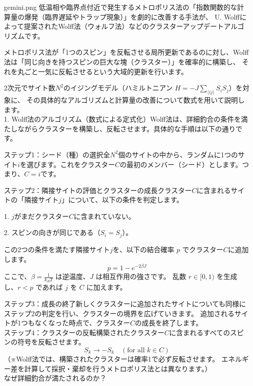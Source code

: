 \documentclass[a4paper,10.5pt]{jlreq}
\begin{document}
\begin{chatbox}{gemini.png}
  低温相や臨界点付近で発生するメトロポリス法の「指数関数的な計算量の爆発（臨界遅延やトラップ現象）」を劇的に改善する手法が、
  U. Wolffによって提案されたWolff法（ウォルフ法）などのクラスターアップデートアルゴリズムです。

  メトロポリス法が「1つのスピン」を反転させる局所更新であるのに対し、Wolff法は「同じ向きを持つスピンの巨大な塊（クラスター）」を確率的に構築し、
  それを丸ごと一気に反転させるという大域的更新を行います。
  
  2次元でサイト数$N^2$のイジングモデル（ハミルトニアン $H = -J\sum_{\langle ij \rangle} S_i S_j$）を対象に、
  その具体的なアルゴリズムと計算量の改善について数式を用いて説明します。\\
  
  1. Wolff法のアルゴリズム（数式による定式化）Wolff法は、詳細釣合の条件を満たしながらクラスターを構築し、反転させます。具体的な手順は以下の通りです。
  
  ステップ1：シード（種）の選択全$N^2$個のサイトの中から、ランダムに1つのサイト$i$を選びます。これをクラスター$C$の最初のメンバー（シード）とします。つまり、$C = {i}$です。
  
  ステップ2：隣接サイトの評価とクラスターの成長クラスター$C$に含まれるサイトの「隣接サイト$j$」について、以下の条件を判定します。

  1. $j$がまだクラスター$C$に含まれていない。

  2. スピンの向きが同じである（$S_i = S_j$）。
  
  この2つの条件を満たす隣接サイト$j$を、以下の結合確率 $p$ でクラスター$C$に追加します。
  $$p = 1 - e^{-2\beta J}$$ここで、$\beta = \frac{1}{k_B T}$ は逆温度、$J$ は相互作用の強さです。
  乱数 $r \in [0, 1)$ を生成し、$r < p$ であれば $j$ を $C$ に加えます。
  
  ステップ3：成長の終了新しくクラスターに追加されたサイトについても同様にステップ2の判定を行い、クラスターの境界を広げていきます。
  追加されるサイトが1つもなくなった時点で、クラスター$C$の成長を終了します。\\
  
  ステップ4：クラスターの反転構築されたクラスター$C$に含まれるすべてのスピンの符号を反転させます。
  $$S_k \to -S_k \quad (\text{for all } k \in C)$$（※Wolff法では、構築されたクラスターは確率1で必ず反転させます。
  エネルギー差を計算して採択・棄却を行うメトロポリス法とは異なります。）\\
  
  なぜ詳細釣合が満たされるのか？
  

\end{chatbox}
\end{document}
